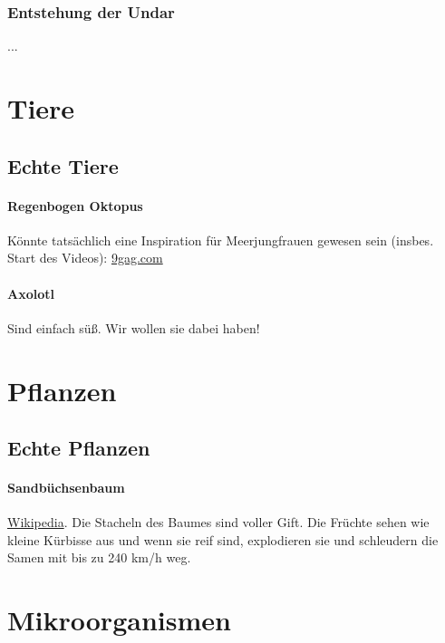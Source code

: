 \subsubsection{Entstehung der Undar}
...

\section{Tiere}
\subsection{Echte Tiere}
\paragraph{Regenbogen Oktopus} Könnte tatsächlich eine Inspiration für Meerjungfrauen gewesen sein (insbes. Start des Videos): \href{https://img-9gag-fun.9cache.com/photo/aVYpQVK\_460svvp9.webm}{9gag.com}
\paragraph{Axolotl} Sind einfach süß. Wir wollen sie dabei haben!

\section{Pflanzen}
\subsection{Echte Pflanzen}
\paragraph{Sandbüchsenbaum} \href{https://de.wikipedia.org/wiki/Sandb\%C3\%BCchsenbaum}{Wikipedia}. Die Stacheln des Baumes sind voller Gift. Die Früchte sehen wie kleine Kürbisse aus und wenn sie reif sind, explodieren sie und schleudern die Samen mit bis zu 240 km/h weg.

\section{Mikroorganismen}
